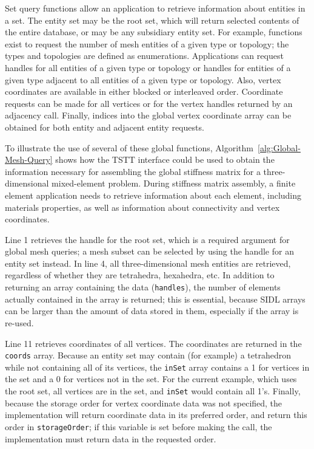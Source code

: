 Set query functions allow an application to retrieve information about
entities in a set.  The entity set may be the root set, which
will return selected contents of the entire database, or may be any
subsidiary entity set.  For example, functions exist to
request the number of mesh entities of a given type or topology; the
types and topologies are defined as enumerations.  Applications can
request handles for all entities of a given type or topology or handles
for entities of a given type adjacent to all entities of a given type or
topology.  Also, vertex coordinates are available in either blocked or
interleaved order. Coordinate requests can be made for all vertices or
for the vertex handles returned by an adjacency call. Finally, indices
into the global vertex coordinate array can be obtained for both entity
and adjacent entity requests.

To illustrate the use of several of these global functions,
Algorithm~\ref{alg:Global-Mesh-Query} shows how the TSTT interface
could be used to obtain the information necessary for assembling the
global stiffness matrix for a three-dimensional mixed-element
problem.  During stiffness matrix assembly, a finite element
application needs to retrieve information about each element,
including materials properties, as well as information about
connectivity and vertex coordinates.

Line 1 retrieves the handle for the root set, which is a required
argument for global mesh queries; a mesh subset can be selected by
using the handle for an entity set instead. In line 4, all three-dimensional
mesh entities are retrieved, regardless of whether they are tetrahedra,
hexahedra, etc. In addition to returning an array containing the data
(\texttt{handles}), the number of elements actually contained in the
array is returned; this is essential, because SIDL arrays can be larger
than the amount of data stored in them, especially if the array is
re-used. 

Line 11 retrieves coordinates of all vertices. The coordinates are
returned in the \texttt{coords} array. Because an entity set may contain
(for example) a tetrahedron while not containing all of its vertices,
the \texttt{inSet} array contains a 1 for vertices in the set and
a 0 for vertices not in the set. For the current example, which uses
the root set, all vertices are in the set, and \texttt{inSet} would
contain all 1's. Finally, because the storage order for vertex coordinate
data was not specified, the implementation will return coordinate
data in its preferred order, and return this order in \texttt{storageOrder};
if this variable is set before making the call, the implementation
must return data in the requested order.

